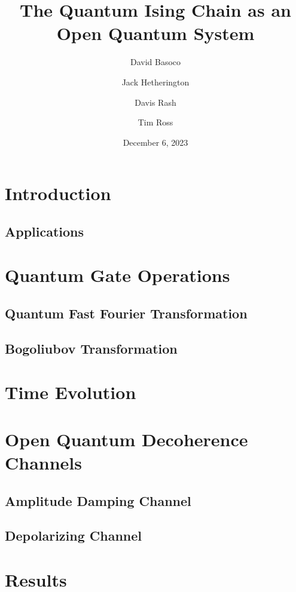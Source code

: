 \documentclass[12pt]{article}
\title{The Quantum Ising Chain as an Open Quantum System}
\author{David Basoco \and Jack Hetherington \and Davis Rash \and Tim Ross}
\date{December 6, 2023}
\begin{document}
  \maketitle


  \section{Introduction}

  \subsection{Applications}

  \section{Quantum Gate Operations}

  \subsection{Quantum Fast Fourier Transformation}

  \subsection{Bogoliubov Transformation}

  \section{Time Evolution}

  \section{Open Quantum Decoherence Channels}

  \subsection{Amplitude Damping Channel}

  \subsection{Depolarizing Channel}

  \section{Results}

  \printbibliography
\end{document}
